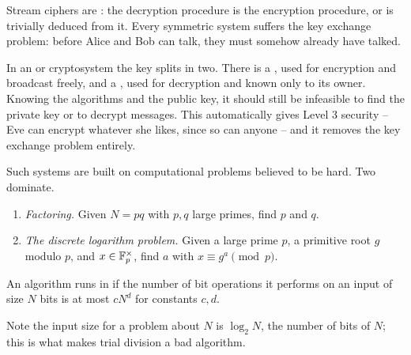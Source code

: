 \documentclass[a4paper]{scrartcl}
\begin{document}
Stream ciphers are : the decryption procedure is the encryption procedure, or is trivially deduced from it. Every symmetric system suffers the key exchange problem: before Alice and Bob can talk, they must somehow already have talked.

In an  or  cryptosystem the key splits in two. There is a , used for encryption and broadcast freely, and a , used for decryption and known only to its owner. Knowing the algorithms and the public key, it should still be infeasible to find the private key or to decrypt messages. This automatically gives Level 3 security -- Eve can encrypt whatever she likes, since so can anyone -- and it removes the key exchange problem entirely.

Such systems are built on computational problems believed to be hard. Two dominate.

\begin{enumerate}[label=(\roman*)]
	\item \emph{Factoring.} Given $N = pq$ with $p,q$ large primes, find $p$ and $q$.
	\item \emph{The discrete logarithm problem.} Given a large prime $p$, a primitive root $g$ modulo $p$, and $x \in \mathbb{F}_p^\times$, find $a$ with $x \equiv g^a \pmod p$.
\end{enumerate}

\begin{definition}
	An algorithm runs in  if the number of bit operations it performs on an input of size $N$ bits is at most $cN^d$ for constants $c,d$.
\end{definition}

Note the input size for a problem about $N$ is $\log_2 N$, the number of bits of $N$; this is what makes trial division a bad algorithm.
\end{document}
